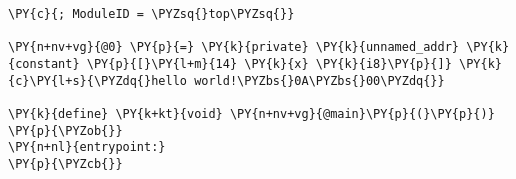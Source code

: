 \begin{Verbatim}[commandchars=\\\{\}]
\PY{c}{; ModuleID = \PYZsq{}top\PYZsq{}}

\PY{n+nv+vg}{@0} \PY{p}{=} \PY{k}{private} \PY{k}{unnamed_addr} \PY{k}{constant} \PY{p}{[}\PY{l+m}{14} \PY{k}{x} \PY{k}{i8}\PY{p}{]} \PY{k}{c}\PY{l+s}{\PYZdq{}hello world!\PYZbs{}0A\PYZbs{}00\PYZdq{}}

\PY{k}{define} \PY{k+kt}{void} \PY{n+nv+vg}{@main}\PY{p}{(}\PY{p}{)} \PY{p}{\PYZob{}}
\PY{n+nl}{entrypoint:}
\PY{p}{\PYZcb{}}
\end{Verbatim}
